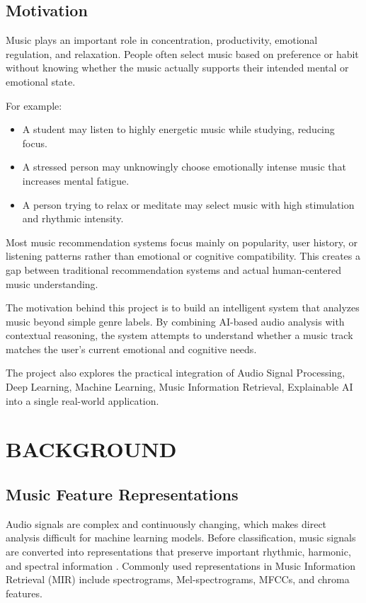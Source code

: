 \documentclass[12pt,a4paper]{report}
\begin{document}
\section{Motivation}

Music plays an important role in concentration, productivity, emotional regulation, and relaxation. People often select music based on preference or habit without knowing whether the music actually supports their intended mental or emotional state.

For example:

\begin{itemize}
    \item A student may listen to highly energetic music while studying, reducing focus.
    
    \item A stressed person may unknowingly choose emotionally intense music that increases mental fatigue.
    
    \item A person trying to relax or meditate may select music with high stimulation and rhythmic intensity.
\end{itemize}

Most music recommendation systems focus mainly on popularity, user history, or listening patterns rather than emotional or cognitive compatibility. This creates a gap between traditional recommendation systems and actual human-centered music understanding.

The motivation behind this project is to build an intelligent system that analyzes music beyond simple genre labels. By combining AI-based audio analysis with contextual reasoning, the system attempts to understand whether a music track matches the user’s current emotional and cognitive needs.

The project also explores the practical integration of Audio Signal Processing, Deep Learning, Machine Learning, Music Information Retrieval, Explainable AI into a single real-world application. 

\chapter{BACKGROUND}

\section{Music Feature Representations}

Audio signals are complex and continuously changing, which makes direct analysis difficult for machine learning models. Before classification, music signals are converted into representations that preserve important rhythmic, harmonic, and spectral information \cite{r13,r14}. Commonly used representations in Music Information Retrieval (MIR) include spectrograms, Mel-spectrograms, MFCCs, and chroma features.
\end{document}
